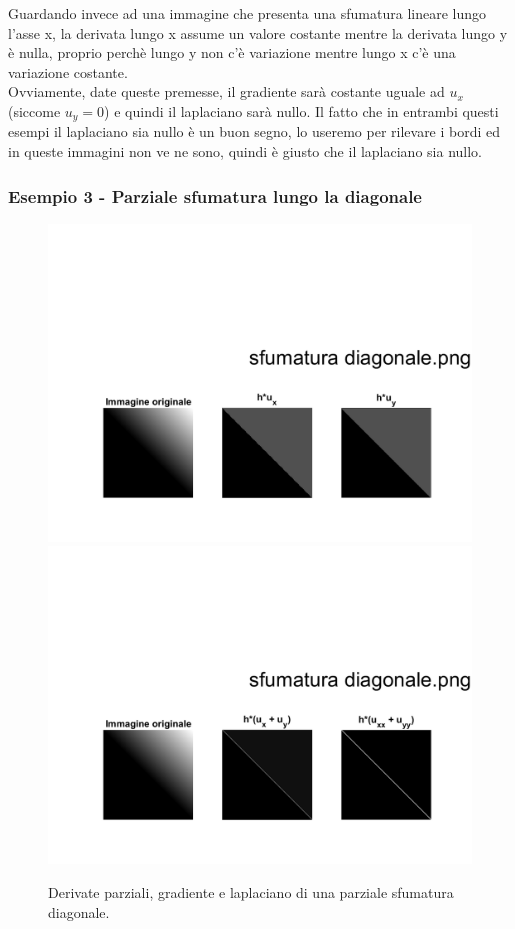 Guardando invece ad una immagine che presenta una sfumatura lineare lungo l'asse x, la derivata lungo x assume un valore costante mentre la derivata lungo y è nulla, proprio perchè lungo y non c'è variazione mentre lungo x c'è una variazione costante.\\
Ovviamente, date queste premesse, il gradiente sarà costante uguale ad $u_x$ (siccome $u_y=0$) e quindi il laplaciano sarà nullo.
Il fatto che in entrambi questi esempi il laplaciano sia nullo è un buon segno, lo useremo per rilevare i bordi ed in queste immagini non ve ne sono, quindi è giusto che il laplaciano sia nullo.\\

\newpage
\subsubsection{Esempio 3 - Parziale sfumatura lungo la diagonale}
\begin{figure}   
\centering
\includegraphics[scale=0.4, trim = 0 0 0 10.5cm, clip]{Pictures/Risultati/sfumatura diagonale bianco e nero derivate parziali.png}
\includegraphics[scale=0.4, trim = 0 0 0 10.5cm, clip]{Pictures/Risultati/sfumatura diagonale bianco e nero gradiente e laplaciano.png}
\caption{Derivate parziali, gradiente e laplaciano di una parziale sfumatura diagonale.}\label{fig:figura}
\end{figure}


